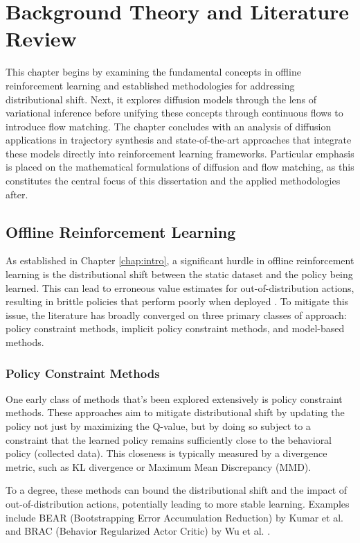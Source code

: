 \chapter{Background Theory and Literature Review}
\label{chap:background}
This chapter begins by examining the fundamental concepts in offline reinforcement learning and established methodologies for addressing distributional shift. Next, it explores diffusion models through the lens of variational inference before unifying these concepts through continuous flows to introduce flow matching. The chapter concludes with an analysis of diffusion applications in trajectory synthesis and state-of-the-art approaches that integrate these models directly into reinforcement learning frameworks. Particular emphasis is placed on the mathematical formulations of diffusion and flow matching, as this constitutes the central focus of this dissertation and the applied methodologies after.

\section{Offline Reinforcement Learning}
\label{sec:offline_rl}
As established in Chapter \ref{chap:intro}, a significant hurdle in offline reinforcement learning is the distributional shift between the static dataset and the policy being learned. This can lead to erroneous value estimates for out-of-distribution actions, resulting in brittle policies that perform poorly when deployed \cite{levineOfflineReinforcementLearning2020}. To mitigate this issue, the literature has broadly converged on three primary classes of approach: policy constraint methods, implicit policy constraint methods, and model-based methods.


\subsection{Policy Constraint Methods}
One early class of methods that’s been explored extensively is policy constraint methods. These approaches aim to mitigate distributional shift by updating the policy not just by maximizing the Q-value, but by doing so subject to a constraint that the learned policy remains sufficiently close to the behavioral policy (collected data). This closeness is typically measured by a divergence metric, such as KL divergence or Maximum Mean Discrepancy (MMD).

To a degree, these methods can bound the distributional shift and the impact of out-of-distribution actions, potentially leading to more stable learning. Examples include BEAR (Bootstrapping Error Accumulation Reduction) by Kumar et al. \cite{kumarStabilizingOffPolicyQLearning2019} and BRAC (Behavior Regularized Actor Critic) by Wu et al. \cite{wuBehaviorRegularizedOffline2019}.

